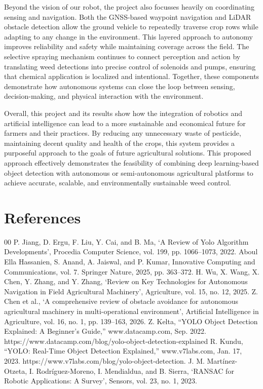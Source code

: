 \documentclass[conference]{IEEEtran}
\begin{document}
Beyond the vision of our robot, the project also focusses heavily on coordinating sensing and navigation. Both the GNSS-based waypoint navigation and LiDAR obstacle detection allow the ground vehicle to repeatedly traverse crop rows while adapting to any change in the environment. This layered approach to autonomy improves reliability and safety while maintaining coverage across the field. The selective spraying mechanism continues to connect perception and action by translating weed detections into precise control of solenoids and pumps, ensuring that chemical application is localized and intentional. Together, these components demonstrate how autonomous systems can close the loop between sensing, decision-making, and physical interaction with the environment.


Overall, this project and its results show how the integration of robotics and artificial intelligence can lead to a more sustainable and economical future for farmers and their practices. By reducing any unnecessary waste of pesticide, maintaining decent quality and health of the crops, this system provides a purposeful approach to the goals of future agricultural solutions. This proposed approach effectively demonstrates the feasibility of combining deep learning-based object detection with autonomous or semi-autonomous agricultural platforms to achieve accurate, scalable, and environmentally sustainable weed control.

\section{References}
\begin{thebibliography}{00}
 P. Jiang, D. Ergu, F. Liu, Y. Cai, and B. Ma, ‘A Review of Yolo Algorithm Developments’, Procedia Computer Science, vol. 199, pp. 1066–1073, 2022.
 Aboul Ella Hassanien, S. Anand, A. Jaiswal, and P. Kumar, Innovative Computing and Communications, vol. 7. Springer Nature, 2025, pp. 363–372.
H. Wu, X. Wang, X. Chen, Y. Zhang, and Y. Zhang, ‘Review on Key Technologies for Autonomous Navigation in Field Agricultural Machinery’, Agriculture, vol. 15, no. 12, 2025.
 Z. Chen et al., ‘A comprehensive review of obstacle avoidance for autonomous agricultural machinery in multi-operational environment’, Artificial Intelligence in Agriculture, vol. 16, no. 1, pp. 139–163, 2026.
 Z. Kelta, “YOLO Object Detection Explained: A Beginner’s Guide,” www.datacamp.com, Sep. 2022. https://www.datacamp.com/blog/yolo-object-detection-explained
 R. Kundu, “YOLO: Real-Time Object Detection Explained,” www.v7labs.com, Jan. 17, 2023. https://www.v7labs.com/blog/yolo-object-detection.
 J. M. Martínez-Otzeta, I. Rodríguez-Moreno, I. Mendialdua, and B. Sierra, ‘RANSAC for Robotic Applications: A Survey’, Sensors, vol. 23, no. 1, 2023.
\end{thebibliography}
\end{document}
